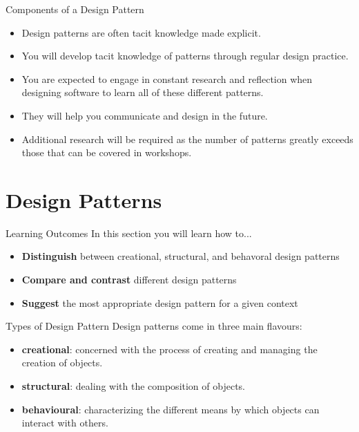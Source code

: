 \begin{frame}{Components of a Design Pattern}
	\begin{itemize}
		\item Design patterns are often tacit knowledge made explicit.
		\item You will develop tacit knowledge of patterns through regular design practice.
		\item You are expected to engage in constant research and reflection
		when designing software to learn all of these different patterns.
		\item They will help you communicate and design in the future.
		\item Additional research will be required as the number of patterns greatly
		exceeds those that can be covered in workshops.
	\end{itemize}
\end{frame}

\part{Design Patterns}
\frame{\partpage}

\begin{frame}{Learning Outcomes}
	In this section you will learn how to...
	
	\begin{itemize}
		\item \textbf{Distinguish} between creational, structural, and behavoral design patterns
		\item \textbf{Compare and contrast} different design patterns
		\item \textbf{Suggest} the most appropriate design pattern for a given context
	\end{itemize}
\end{frame}

\begin{frame}{Types of Design Pattern}
Design patterns come in three main flavours:

	\begin{itemize}
		\item \textbf{creational}: concerned with the process of creating and managing the creation of objects.
		\item \textbf{structural}: dealing with the composition of objects.
		\item \textbf{behavioural}: characterizing the different means by which objects can interact with others.
	\end{itemize}
\end{frame}

